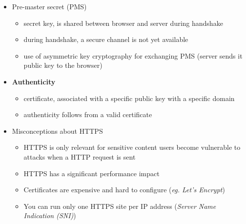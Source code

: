\documentclass[12pt,titlepage,a4paper]{report}
\begin{document}
\begin{itemize}
		\item Pre-master secret (PMS)
		\begin{itemize}
			\item secret key, is shared between browser and server during handshake
			\item during handshake, a secure channel is not yet available
			\item use of asymmetric key cryptography for exchanging PMS (server sends it public key to the browser)
		\end{itemize}
	
		\item \textbf{Authenticity}
		\begin{itemize}
			\item certificate, associated with a specific public key with a specific domain
			\item authenticity follows from a valid certificate
		\end{itemize}
	
		\item Misconceptions about HTTPS
		\begin{itemize}
			\item HTTPS is only relevant for sensitive content 
				\subitem users become vulnerable to attacks when a HTTP request is sent
			\item HTTPS has a significant performance impact
			\item Certificates are expensive and hard to configure (\emph{eg. Let's Encrypt})
			\item You can run only one HTTPS site per IP address (\emph{Server Name Indication (SNI)})
		\end{itemize}
	\end{itemize}
\end{document}
